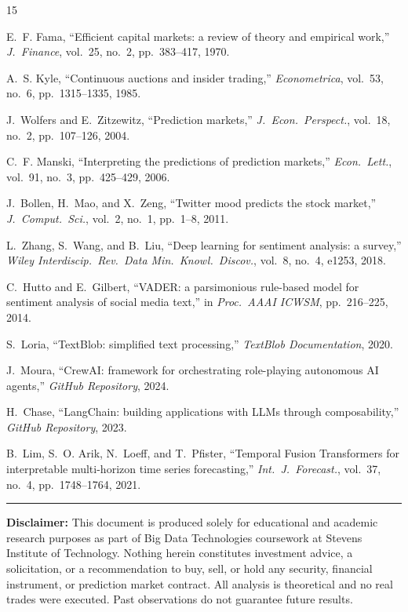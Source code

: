 \documentclass[conference]{IEEEtran}
\begin{document}
\begin{thebibliography}{15}

E.~F. Fama, ``Efficient capital markets: a review of theory and empirical work,'' \textit{J.\ Finance}, vol.~25, no.~2, pp.~383--417, 1970.

A.~S. Kyle, ``Continuous auctions and insider trading,'' \textit{Econometrica}, vol.~53, no.~6, pp.~1315--1335, 1985.

J.~Wolfers and E.~Zitzewitz, ``Prediction markets,'' \textit{J.\ Econ.\ Perspect.}, vol.~18, no.~2, pp.~107--126, 2004.

C.~F. Manski, ``Interpreting the predictions of prediction markets,'' \textit{Econ.\ Lett.}, vol.~91, no.~3, pp.~425--429, 2006.

J.~Bollen, H.~Mao, and X.~Zeng, ``Twitter mood predicts the stock market,'' \textit{J.\ Comput.\ Sci.}, vol.~2, no.~1, pp.~1--8, 2011.

L.~Zhang, S.~Wang, and B.~Liu, ``Deep learning for sentiment analysis: a survey,'' \textit{Wiley Interdiscip.\ Rev.\ Data Min.\ Knowl.\ Discov.}, vol.~8, no.~4, e1253, 2018.

C.~Hutto and E.~Gilbert, ``VADER: a parsimonious rule-based model for sentiment analysis of social media text,'' in \textit{Proc.\ AAAI ICWSM}, pp.~216--225, 2014.

S.~Loria, ``TextBlob: simplified text processing,'' \textit{TextBlob Documentation}, 2020.

J.~Moura, ``CrewAI: framework for orchestrating role-playing autonomous AI agents,'' \textit{GitHub Repository}, 2024.

H.~Chase, ``LangChain: building applications with LLMs through composability,'' \textit{GitHub Repository}, 2023.

B.~Lim, S.~O. Arik, N.~Loeff, and T.~Pfister, ``Temporal Fusion Transformers for interpretable multi-horizon time series forecasting,'' \textit{Int.\ J.\ Forecast.}, vol.~37, no.~4, pp.~1748--1764, 2021.

\end{thebibliography}

\vspace{1em}
\noindent\rule{\columnwidth}{0.4pt}
\small
\textbf{Disclaimer:} This document is produced solely for educational and academic research purposes as part of Big Data Technologies coursework at Stevens Institute of Technology. Nothing herein constitutes investment advice, a solicitation, or a recommendation to buy, sell, or hold any security, financial instrument, or prediction market contract. All analysis is theoretical and no real trades were executed. Past observations do not guarantee future results.
\end{document}
